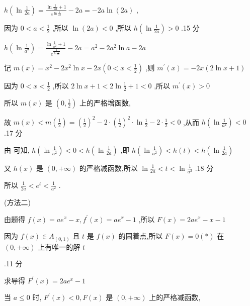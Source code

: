 \documentclass[10pt]{article}
\newcommand*\circled[1]{\tikz[baseline=(char.base)]{\node[shape=circle,draw,inner sep=1.5pt] (char) {\small #1};}}
\begin{document}
\(h\left( {\ln \frac{1}{2a}}\right)  = \frac{\ln \frac{1}{2a} + 1}{{e}^{\ln \frac{1}{2a}}} - {2a} =  - {2a}\ln \left( {2a}\right)\) ,

因为 \(0 < a < \frac{1}{2}\) ,所以 \(\ln \left( {2a}\right)  < 0\) ,所以 \(h\left( {\ln \frac{1}{2a}}\right)  > 0\) .15 分

\(h\left( {\ln \frac{1}{{a}^{2}}}\right)  = \frac{\ln \frac{1}{{a}^{2}} + 1}{{e}^{\frac{1}{\ln \frac{1}{{a}^{2}}}}} - {2a} = {a}^{2} - 2{a}^{2}\ln a - {2a}\)

记 \(m\left( x\right)  = {x}^{2} - 2{x}^{2}\ln x - {2x}\left( {0 < x < \frac{1}{2}}\right)\) ,则 \({m}^{\prime }\left( x\right)  =  - {2x}\left( {2\ln x + 1}\right)\)

因为 \(0 < x < \frac{1}{2}\) ,所以 \(2\ln x + 1 < 2\ln \frac{1}{2} + 1 < 0\) ,所以 \({m}^{\prime }\left( x\right)  > 0\)

所以 \(m\left( x\right)\) 是 \(\left( {0,\frac{1}{2}}\right)\) 上的严格增函数,

故 \(m\left( x\right)  < m\left( \frac{1}{2}\right)  = {\left( \frac{1}{2}\right) }^{2} - 2 \cdot  {\left( \frac{1}{2}\right) }^{2} \cdot  \ln \frac{1}{2} - 2 \cdot  \frac{1}{2} < 0\) ,从而 \(h\left( {\ln \frac{1}{{a}^{2}}}\right)  < 0\) .17 分

由 \circled{1}  \circled{2} 可知, \(h\left( {\ln \frac{1}{{a}^{2}}}\right)  < 0 < h\left( {\ln \frac{1}{2a}}\right)\) ,即 \(h\left( {\ln \frac{1}{{a}^{2}}}\right)  < h\left( t\right)  < h\left( {\ln \frac{1}{2a}}\right)\)

又 \(h\left( x\right)\) 是 \(\left( {0, + \infty }\right)\) 的严格减函数,所以 \(\ln \frac{1}{2a} < t < \ln \frac{1}{{a}^{2}}\) .18 分

所以 \(\frac{1}{2a} < {e}^{t} < \frac{1}{{a}^{2}}\) .

(方法二)

由题得 \(f\left( x\right)  = a{e}^{x} - x,{f}^{\prime }\left( x\right)  = a{e}^{x} - 1\) ,所以 \(F\left( x\right)  = {2a}{e}^{x} - x - 1\)

因为 \(f\left( x\right)  \in  {A}_{\left( 0,1\right) }\) 且 \(t\) 是 \(f\left( x\right)\) 的固着点,所以 \(F\left( x\right)  = 0\left( *\right)\) 在 \(\left( {0, + \infty }\right)\) 上有唯一的解 \(t\)

.11 分

求导得 \({F}^{\prime }\left( x\right)  = {2a}{e}^{x} - 1\)

当 \(a \leq  0\) 时, \({F}^{\prime }\left( x\right)  < 0,F\left( x\right)\) 是 \(\left( {0, + \infty }\right)\) 上的严格减函数,
\end{document}
